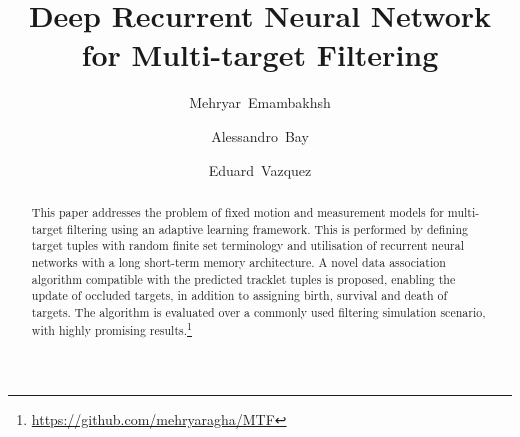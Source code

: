 \documentclass[runningheads]{llncs}
\begin{document}
%
\title{Deep Recurrent Neural Network\\for Multi-target Filtering}
%
%
\author{Mehryar~Emambakhsh\and
Alessandro~Bay\and
Eduard~Vazquez}
%
%
%
\maketitle              %
%
\begin{abstract}
This paper addresses the problem of fixed motion and measurement models for multi-target filtering using an adaptive learning framework. This is performed by defining target tuples with random finite set terminology and utilisation of recurrent neural networks with a long short-term memory architecture. A novel data association algorithm compatible with the predicted tracklet tuples is proposed, enabling the update of occluded targets, in addition to assigning birth, survival and death of targets. The algorithm is evaluated over a commonly used filtering simulation scenario, with highly promising results.\footnote{\url{https://github.com/mehryaragha/MTF}}

\end{abstract}
%
%
%
\end{document}

